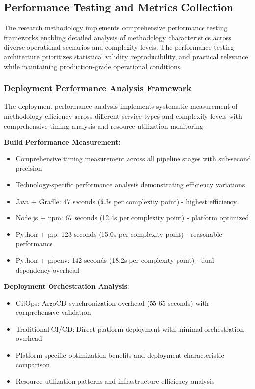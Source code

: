 \subsection{Performance Testing and Metrics Collection}

The research methodology implements comprehensive performance testing frameworks enabling detailed analysis of methodology characteristics across diverse operational scenarios and complexity levels. The performance testing architecture prioritizes statistical validity, reproducibility, and practical relevance while maintaining production-grade operational conditions.

\subsubsection{Deployment Performance Analysis Framework}

The deployment performance analysis implements systematic measurement of methodology efficiency across different service types and complexity levels with comprehensive timing analysis and resource utilization monitoring.

\textbf{Build Performance Measurement:}
\begin{itemize}
\item Comprehensive timing measurement across all pipeline stages with sub-second precision
\item Technology-specific performance analysis demonstrating efficiency variations
\item Java + Gradle: 47 seconds (6.3s per complexity point) - highest efficiency
\item Node.js + npm: 67 seconds (12.4s per complexity point) - platform optimized
\item Python + pip: 123 seconds (15.0s per complexity point) - reasonable performance
\item Python + pipenv: 142 seconds (18.2s per complexity point) - dual dependency overhead
\end{itemize}

\textbf{Deployment Orchestration Analysis:}
\begin{itemize}
\item GitOps: ArgoCD synchronization overhead (55-65 seconds) with comprehensive validation
\item Traditional CI/CD: Direct platform deployment with minimal orchestration overhead
\item Platform-specific optimization benefits and deployment characteristic comparison
\item Resource utilization patterns and infrastructure efficiency analysis
\end{itemize}

